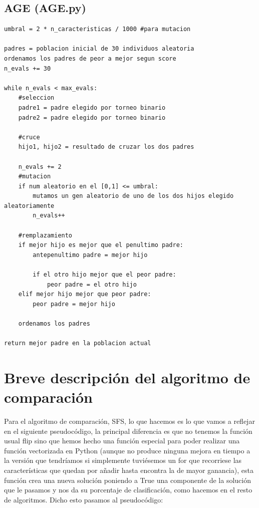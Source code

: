 \documentclass[10pt,a4paper]{article}
\begin{document}
\newpage

\subsection{\color[rgb]{0.0,0.0,0.51}AGE (AGE.py)}

\begin{lstlisting}
umbral = 2 * n_caracteristicas / 1000 #para mutacion

padres = poblacion inicial de 30 individuos aleatoria
ordenamos los padres de peor a mejor segun score
n_evals += 30

while n_evals < max_evals:
	#seleccion
	padre1 = padre elegido por torneo binario
	padre2 = padre elegido por torneo binario
	
	#cruce
	hijo1, hijo2 = resultado de cruzar los dos padres
	
	n_evals += 2
	#mutacion
	if num aleatorio en el [0,1] <= umbral:
		mutamos un gen aleatorio de uno de los dos hijos elegido aleatoriamente
		n_evals++
		
	#remplazamiento
	if mejor hijo es mejor que el penultimo padre:
		antepenultimo padre = mejor hijo
		
		if el otro hijo mejor que el peor padre:
			peor padre = el otro hijo
	elif mejor hijo mejor que peor padre:
		peor padre = mejor hijo
		
	ordenamos los padres
	
return mejor padre en la poblacion actual
\end{lstlisting}

\newpage

\section{\color[rgb]{0.0,0.0,0.21}Breve descripción del algoritmo de comparación}

Para el algoritmo de comparación, SFS, lo que hacemos es lo que vamos a reflejar en el siguiente pseudocódigo, la principal diferencia es que no tenemos la función usual flip sino que hemos hecho una función especial para poder realizar una función vectorizada en Python (aunque no produce ninguna mejora en tiempo a la versión que tendríamos si simplemente tuviésemos un for que recorriese las características que quedan por añadir hasta encontra la de mayor ganancia), esta función crea una nueva solución poniendo a True una componente de la solución que le pasamos y nos da su porcentaje de clasificación, como hacemos en el resto de algoritmos. Dicho esto pasamos al pseudocódigo:
\end{document}

